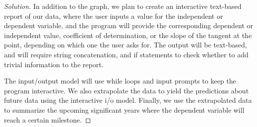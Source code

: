 \documentclass[12pt]{article}
\newenvironment{solution}
  {\renewcommand\qedsymbol{$\blacksquare$}
  \begin{proof}[Solution]}
  {\end{proof}}
\renewcommand\qedsymbol{$\blacksquare$}
\begin{document}
\begin{enumerate}
\begin{solution}
In addition to the graph, we plan to create an interactive text-based report of our data, where the user  inputs a value for the independent or dependent variable, and the program will provide the corresponding dependent or independent value, coefficient of determination, or the slope of the tangent at the point, depending on which one the user asks for. The output will be text-based, and will require string concatenation, and if statements to check whether to add trivial information to the report. 

The input/output model will use while loops and input prompts to keep the program interactive. We also extrapolate the data to yield the predictions about future data using the interactive i/o model. Finally, we use the extrapolated data to summarize the upcoming significant years where the dependent variable will reach a certain milestone.


\end{solution}

\maketitle

\newpage

 \end{enumerate}
\end{document}
